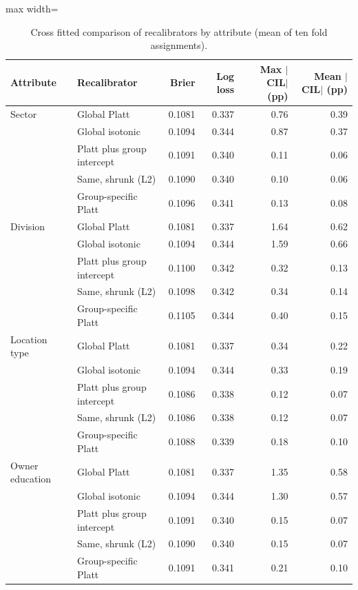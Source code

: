 \documentclass[11pt,a4paper]{article}
\newcommand{\tabsize}{\footnotesize}
\begin{document}
\begin{table}[H]\centering\tabsize\caption{Cross fitted comparison of recalibrators by attribute (mean of ten fold assignments).}\label{tab:recgrp}
\begin{adjustbox}{max width=\textwidth}
\begin{tabular}{llrrrr}
\toprule
Attribute & Recalibrator & Brier & Log loss & Max $|$CIL$|$ (pp) & Mean $|$CIL$|$ (pp) \\
\midrule
Sector & Global Platt & 0.1081 & 0.337 & 0.76 & 0.39 \\
 & Global isotonic & 0.1094 & 0.344 & 0.87 & 0.37 \\
 & Platt plus group intercept & 0.1091 & 0.340 & 0.11 & 0.06 \\
 & Same, shrunk (L2) & 0.1090 & 0.340 & 0.10 & 0.06 \\
 & Group-specific Platt & 0.1096 & 0.341 & 0.13 & 0.08 \\
\midrule
Division & Global Platt & 0.1081 & 0.337 & 1.64 & 0.62 \\
 & Global isotonic & 0.1094 & 0.344 & 1.59 & 0.66 \\
 & Platt plus group intercept & 0.1100 & 0.342 & 0.32 & 0.13 \\
 & Same, shrunk (L2) & 0.1098 & 0.342 & 0.34 & 0.14 \\
 & Group-specific Platt & 0.1105 & 0.344 & 0.40 & 0.15 \\
\midrule
Location type & Global Platt & 0.1081 & 0.337 & 0.34 & 0.22 \\
 & Global isotonic & 0.1094 & 0.344 & 0.33 & 0.19 \\
 & Platt plus group intercept & 0.1086 & 0.338 & 0.12 & 0.07 \\
 & Same, shrunk (L2) & 0.1086 & 0.338 & 0.12 & 0.07 \\
 & Group-specific Platt & 0.1088 & 0.339 & 0.18 & 0.10 \\
\midrule
Owner education & Global Platt & 0.1081 & 0.337 & 1.35 & 0.58 \\
 & Global isotonic & 0.1094 & 0.344 & 1.30 & 0.57 \\
 & Platt plus group intercept & 0.1091 & 0.340 & 0.15 & 0.07 \\
 & Same, shrunk (L2) & 0.1090 & 0.340 & 0.15 & 0.07 \\
 & Group-specific Platt & 0.1091 & 0.341 & 0.21 & 0.10 \\
\bottomrule
\end{tabular}
\end{adjustbox}\end{table}
\end{document}
